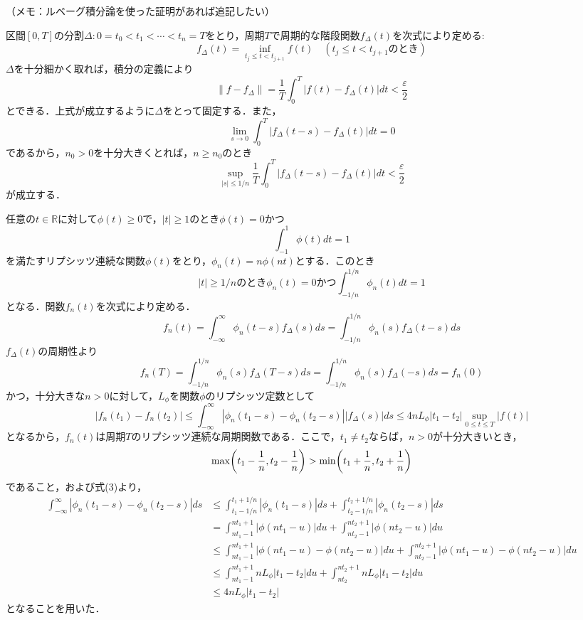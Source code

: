 \documentclass[dvipdfmx,a4j,10pt]{jsarticle}
\makeatletter
\theoremstyle{mystyle1}
\theoremstyle{mystyle3}
\theoremstyle{mystyle4}
\theoremstyle{mystyle2}
\renewenvironment{proof}[1][\proofname]{\par
  \pushQED{\qed}%
  \normalfont
  \topsep6\p@\@plus6\p@ \trivlist
  \item[\hskip\labelsep{\bfseries\sffamily #1}]\ignorespaces
}{%
  \popQED\endtrivlist\@endpefalse
}
\renewcommand\proofname{証明}
\makeatother
\begin{document}
（メモ：ルベーグ積分論を使った証明があれば追記したい）

\begin{proof}
    区間$[0,T]$の分割$\Delta:0=t_0<t_1<\cdots<t_n=T$をとり，周期$T$で周期的な階段関数$f_\Delta (t)$を次式により定める:
    \[
        f_\Delta (t)=\inf_{t_j\leq t<t_{j+1}} f(t)\quad(t_j\leq t<t_{j+1}のとき)
    \]
    $\Delta$を十分細かく取れば，積分の定義により
    \begin{equation}
        \|f-f_\Delta\|=\frac{1}{T}\int_0^T|f(t)-f_\Delta(t)|dt<\frac{\varepsilon}{2} \tag{1}
    \end{equation}
    とできる．上式が成立するように$\Delta$をとって固定する．また，
    \[
        \lim_{s\to 0}\int_0^T|f_\Delta(t-s)-f_\Delta(t)|dt=0
    \]
    であるから，$n_0>0$を十分大きくとれば，$n\geq n_0$のとき
    \begin{equation}
        \sup_{|s|\leq 1/n}\frac{1}{T}\int_0^T|f_\Delta(t-s)-f_\Delta(t)|dt<\frac{\varepsilon}{2} \tag{2}
    \end{equation}
    が成立する．

    任意の$t\in\mathbb{R}$に対して$\phi(t)\geq 0$で，$|t|\geq 1$のとき$\phi(t)=0$かつ
    \[
        \int_{-1}^1 \phi(t)dt=1
    \]
    を満たすリプシッツ連続な関数$\phi(t)$をとり，$\phi_n(t)=n\phi(nt)$とする．このとき
    \begin{equation}
        |t|\geq 1/nのとき\phi_n(t)=0かつ\int_{-1/n}^{1/n}\phi_n(t)dt=1 \tag{3}
    \end{equation}
    となる．関数$f_n(t)$を次式により定める．
    \[
        f_n(t)=\int_{-\infty}^\infty \phi_n(t-s)f_\Delta(s)ds=\int_{-1/n}^{1/n}\phi_n(s)f_\Delta(t-s)ds
    \]
    $f_\Delta (t)$の周期性より
    \[
        f_n(T)=\int_{-1/n}^{1/n}\phi_n(s)f_\Delta(T-s)ds=\int_{-1/n}^{1/n}\phi_n(s)f_\Delta(-s)ds=f_n(0)
    \]
    かつ，十分大きな$n>0$に対して，$L_\phi$を関数$\phi$のリプシッツ定数として
    \[
        |f_n(t_1)-f_n(t_2)|\leq\int_{-\infty}^\infty|\phi_n(t_1-s)-\phi_n(t_2-s)||f_\Delta(s)|ds\leq 4nL_\phi|t_1-t_2|\sup_{0\leq t\leq T}|f(t)|
    \]
    となるから，$f_n(t)$は周期$T$のリプシッツ連続な周期関数である．ここで，$t_1\neq t_2$ならば，$n>0$が十分大きいとき，
    \[
        \max\mleft(t_1-\frac{1}{n},t_2-\frac{1}{n}\mright)>\min\mleft(t_1+\frac{1}{n},t_2+\frac{1}{n}\mright)
    \]
    であること，および式(3)より，
    \[
        \begin{split}
            \int_{-\infty}^\infty|\phi_n(t_1-s)-\phi_n(t_2-s)|ds
            &\leq \int_{t_1-1/n}^{t_1+1/n}|\phi_n(t_1-s)|ds+\int_{t_2-1/n}^{t_2+1/n}|\phi_n(t_2-s)|ds \\
            & =\int_{nt_1-1}^{nt_1+1}|\phi(nt_1-u)|du+\int_{nt_2-1}^{nt_2+1}|\phi(nt_2-u)|du \\
            &\leq \int_{nt_1-1}^{nt_1+1}|\phi(nt_1-u)-\phi(nt_2-u)|du+\int_{nt_2-1}^{nt_2+1}|\phi(nt_1-u)-\phi(nt_2-u)|du \\
            &\leq \int_{nt_1-1}^{nt_1+1} nL_\phi|t_1-t_2|du +\int_{nt_2}^{nt_2+1}nL_\phi|t_1-t_2|du \\
            &\leq 4nL_\phi|t_1-t_2|
        \end{split}
    \]
    となることを用いた．


\end{proof}
\end{document}
